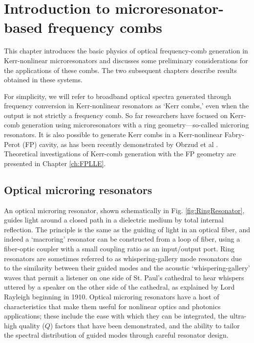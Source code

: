 \chapter{Introduction to microresonator-based frequency combs}
 \label{ch:microresonators}
 
 This chapter introduces the basic physics of optical frequency-comb generation in Kerr-nonlinear microresonators and discusses some preliminary considerations for the applications of these combs. The two  subsequent chapters describe results obtained in these systems. 
 
 For simplicity, we will refer to broadband optical spectra generated through frequency conversion in Kerr-nonlinear resonators as `Kerr combs,' even when the output is not strictly a frequency comb. So far researchers have focused on Kerr-comb generation using microresonators with a ring geometry---so-called microring resonators. It is also possible to generate Kerr combs in a Kerr-nonlinear Fabry-Perot (FP) cavity, as has been recently demonstrated by Obrzud et al \cite{Obrzud2017}. Theoretical investigations of Kerr-comb generation with the FP geometry are presented in Chapter \ref{ch:FPLLE}.
 

 
 \section{Optical microring resonators}
An optical microring resonator, shown schematically in Fig. \ref{fig:RingResonator}, guides light around a closed path in a dielectric medium by total internal reflection. The principle is the same as the guiding of light in an optical fiber, and indeed a `macroring' resonator can be constructed from a loop of fiber, using a fiber-optic coupler with a small coupling ratio as an input/output port. Ring resonators are sometimes referred to as whispering-gallery mode resonators due to the similarity between their guided modes and the acoustic `whispering-gallery' waves that permit a listener on one side of St. Paul's cathedral to hear whispers uttered by a speaker on the other side of the cathedral, as explained by Lord Rayleigh beginning in 1910. Optical microring resonators have a host of characteristics that make them useful for nonlinear optics and photonics applications; these include the ease with which they can be integrated, the ultra-high quality ($Q$) factors that have been demonstrated, and the ability to tailor the spectral distribution of guided modes through careful resonator design.  


